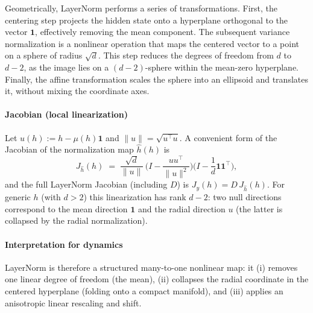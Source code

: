 \documentclass[a4paper,12pt]{article}
\begin{document}
Geometrically, LayerNorm performs a series of transformations. First, the centering step projects the hidden state onto a hyperplane orthogonal to the vector $\mathbf{1}$, effectively removing the mean component. The subsequent variance normalization is a nonlinear operation that maps the centered vector to a point on a sphere of radius $\sqrt{d}$. This step reduces the degrees of freedom from $d$ to $d-2$, as the image lies on a $(d-2)$-sphere within the mean-zero hyperplane. Finally, the affine transformation scales the sphere into an ellipsoid and translates it, without mixing the coordinate axes.

\paragraph{Jacobian (local linearization)}
Let \(u(h):=h-\mu(h)\mathbf1\) and \(\|u\|=\sqrt{u^\top u}\).  A convenient form of the Jacobian of the normalization map \(\widehat{h}(h)\) is
\[
J_{\widehat{h}}(h)
\;=\;
\frac{\sqrt{d}}{\|u\|}\,\Big(I - \frac{u u^\top}{\|u\|^2}\Big)\Big(I - \frac{1}{d}\mathbf1\mathbf1^\top\Big),
\]
and the full LayerNorm Jacobian (including \(D\)) is \(J_y(h)=D\,J_{\widehat{h}}(h)\).  For generic \(h\) (with \(d>2\)) this linearization has rank \(d-2\): two null directions correspond to the mean direction \(\mathbf1\) and the radial direction \(u\) (the latter is collapsed by the radial normalization).

\paragraph{Interpretation for dynamics} %
LayerNorm is therefore a structured many-to-one nonlinear map: it (i) removes one linear degree of freedom (the mean), (ii) collapses the radial coordinate in the centered hyperplane (folding onto a compact manifold), and (iii) applies an anisotropic linear rescaling and shift.
\end{document}
